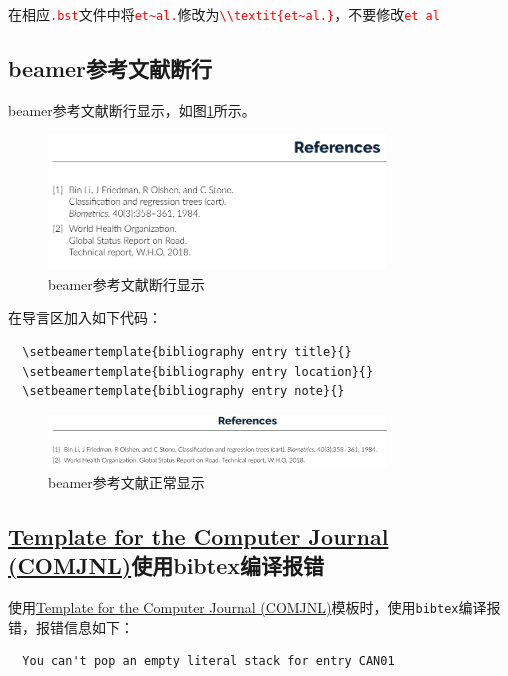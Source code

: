 在相应\textcolor{red}{\lstinline|.bst|}文件中将\textcolor{red}{\lstinline{et~al.}}修改为\textcolor{red}{\lstinline|\\textit{et~al.}|}，不要修改\textcolor{red}{\lstinline{et al}}

\subsection{beamer参考文献断行}\label{subsec:beamer-ref-break}
beamer参考文献断行显示，如图\ref{fig:beamer-ref}所示。
\begin{figure}[!h]
  \centering
  \includegraphics[width=0.8\textwidth]{figure/chap-ref/cankaowenxianduanhang.png}
  \caption{beamer参考文献断行显示}
  \label{fig:beamer-ref}
\end{figure}

在导言区加入如下代码：
\begin{lstlisting}
  \setbeamertemplate{bibliography entry title}{}
  \setbeamertemplate{bibliography entry location}{}
  \setbeamertemplate{bibliography entry note}{}
\end{lstlisting}
\begin{figure}[!h]
  \centering
  \includegraphics[width=0.8\textwidth]{figure/chap-ref/cankaowenxianduanhang1.png}
  \caption{beamer参考文献正常显示}
  \label{fig:beamer-ref1}
\end{figure}

\subsection{\href{https://cn.overleaf.com/latex/templates/template-for-the-computer-journal-comjnl/xwtyhjrpbtvp}{Template for the Computer Journal (COMJNL)}使用bibtex编译报错}\label{subsec:comjnl-bibtex-error}

使用\href{https://cn.overleaf.com/latex/templates/template-for-the-computer-journal-comjnl/xwtyhjrpbtvp}{Template for the Computer Journal (COMJNL)}模板时，使用\lstinline{bibtex}编译报错，报错信息如下：
\begin{lstlisting}
  You can't pop an empty literal stack for entry CAN01
\end{lstlisting}

